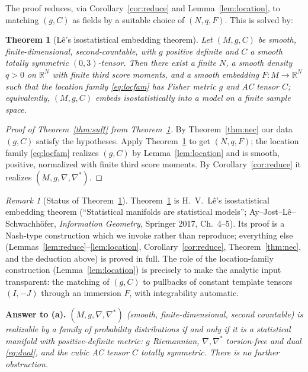 \documentclass{amsart}
\newtheorem{theorem}{Theorem}
\theoremstyle{definition}
\theoremstyle{remark}
\newtheorem{remark}{Remark}
\begin{document}
The proof reduces, via Corollary~\ref{cor:reduce} and Lemma~\ref{lem:location},
to matching $(g,C)$ as fields by a suitable choice of $(N,q,F)$. This is solved by:

\begin{theorem}[L\^e's isostatistical embedding theorem]\label{thm:Le}
Let $(M,g,C)$ be smooth, finite-dimensional, second-countable, with $g$ positive
definite and $C$ a smooth totally symmetric $(0,3)$-tensor. Then there exist a
finite $N$, a smooth density $q>0$ on $\mathbb R^{N}$ with finite third score
moments, and a smooth embedding $F\colon M\to\mathbb R^{N}$ such that the
location family \eqref{eq:locfam} has Fisher metric $g$ and AC tensor $C$;
equivalently, $(M,g,C)$ embeds isostatistically into a model on a finite sample
space.
\end{theorem}

\begin{proof}[Proof of Theorem~\ref{thm:suff} from Theorem~\ref{thm:Le}]
By Theorem~\ref{thm:nec} our data $(g,C)$ satisfy the hypotheses. Apply
Theorem~\ref{thm:Le} to get $(N,q,F)$; the location family
\eqref{eq:locfam} realizes $(g,C)$ by Lemma~\ref{lem:location} and is smooth,
positive, normalized with finite third score moments. By
Corollary~\ref{cor:reduce} it realizes $(M,g,\nabla,\nabla^{*})$.
\end{proof}

\begin{remark}[Status of Theorem~\ref{thm:Le}]
Theorem~\ref{thm:Le} is H.~V.~L\^e's isostatistical embedding theorem
(``Statistical manifolds are statistical models''; Ay--Jost--L\^e--Schwachh\"ofer,
\emph{Information Geometry}, Springer 2017, Ch.~4--5). Its proof is a Nash-type
construction which we invoke rather than reproduce; everything else
(Lemmas~\ref{lem:reduce}--\ref{lem:location}, Corollary~\ref{cor:reduce},
Theorem~\ref{thm:nec}, and the deduction above) is proved in full. The role of
the location-family construction (Lemma~\ref{lem:location}) is precisely to make
the analytic input transparent: the matching of $(g,C)$ to pullbacks of constant
template tensors $(I,-J)$ through an immersion $F$, with integrability automatic.
\end{remark}

\medskip
\noindent\textbf{Answer to (a).}
\emph{$(M,g,\nabla,\nabla^{*})$ (smooth, finite-dimensional, second countable) is
realizable by a family of probability distributions if and only if it is a
statistical manifold with positive-definite metric: $g$ Riemannian,
$\nabla,\nabla^{*}$ torsion-free and dual \eqref{eq:dual}, and the cubic AC tensor
$C$ totally symmetric. There is no further obstruction.}
\end{document}
